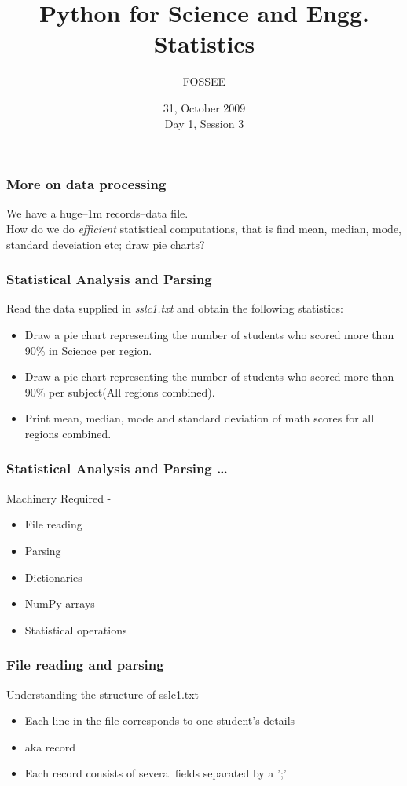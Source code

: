 \documentclass[14pt,compress]{beamer}
\title[Statistics]{Python for Science and Engg. Statistics}
\author[FOSSEE] {FOSSEE}
\institute[IIT Bombay] {Department of Aerospace Engineering\\IIT Bombay}
\date[] {31, October 2009\\Day 1, Session 3}
\begin{document}
\begin{frame}
  \maketitle
\end{frame}


\begin{frame}
  \frametitle{More on data processing}
  \begin{block}{}
    We have a huge--1m records--data file.\\How do we do \emph{efficient} statistical computations, that is find mean, median, mode, standard deveiation etc; draw pie charts?
  \end{block}
\end{frame}


\begin{frame}
  \frametitle{Statistical Analysis and Parsing}
  Read the data supplied in \emph{sslc1.txt} and obtain the following statistics:
  \begin{itemize}
    \item Draw a pie chart representing the number of students who scored more than 90\% in Science per region.
    \item Draw a pie chart representing the number of students who scored more than 90\% per subject(All regions combined).
    \item Print mean, median, mode and standard deviation of math scores for all regions combined.
  \end{itemize}
\end{frame}

\begin{frame}
  \frametitle{Statistical Analysis and Parsing \ldots}
  Machinery Required -
  \begin{itemize}
    \item File reading
    \item Parsing
    \item Dictionaries
    \item NumPy arrays
    \item Statistical operations
  \end{itemize}
\end{frame}

\begin{frame}
  \frametitle{File reading and parsing}
  Understanding the structure of sslc1.txt
  \begin{itemize}
    \item Each line in the file corresponds to one student's details
    \item aka record
    \item Each record consists of several fields separated by a ';'
  \end{itemize}
\end{frame}
\end{document}
